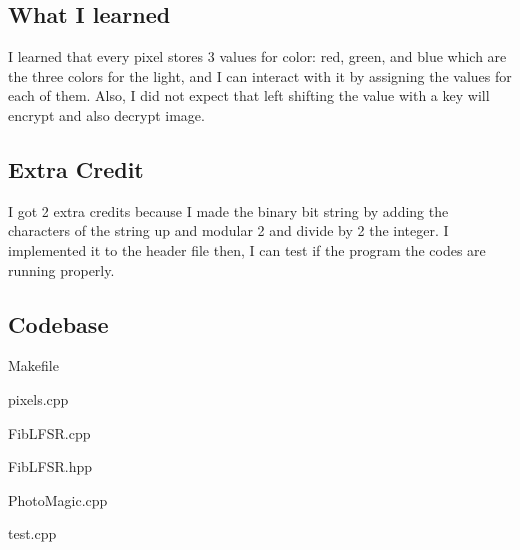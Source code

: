 \subsection{What I learned}\label{sec:ps1b:learned}

I learned that every pixel stores 3 values for color: red, green, and blue which are the three colors for the light, and I can interact with it by assigning the values for each of them.
Also, I did not expect that left shifting the value with a key will encrypt and also decrypt image.

\subsection{Extra Credit}\label{sec:ps1b:Extra Credit}

I got 2 extra credits because I made the binary bit string by adding the characters of the string up and modular 2 and divide by 2 the integer. I implemented it to the header file then, I can test if the program the codes are running properly.

\subsection{Codebase}\label{sec:ps1b:code}

Makefile

pixels.cpp

FibLFSR.cpp

FibLFSR.hpp

PhotoMagic.cpp

test.cpp


\newpage
